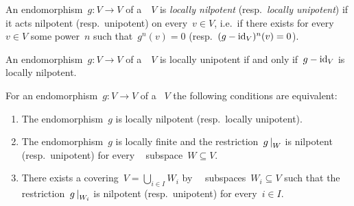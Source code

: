 \begin{definition}
  An endomorphism~$g \colon V \to V$ of a~~$V$ is \emph{locally nilpotent} (resp.\ \emph{locally unipotent}) if it acts nilpotent (resp.\ unipotent) on every~$v \in V$, i.e.\ if there exists for every~$v \in V$ some power~$n$ such that~$g^n(v) = 0$ (resp.~$(g - \operatorname{id}_V)^n(v) = 0$).
\end{definition}


\begin{remark}
  An endomorphism~$g \colon V \to V$ of a~~$V$ is locally unipotent if and only if~$g - \operatorname{id}_V$ is locally nilpotent.
\end{remark}


\begin{lemma}
  \label{characterization of locally potent}
  For an endomorphism~$g \colon V \to V$ of a ~$V$ the following conditions are equivalent:
  \begin{enumerate}
    \item
      \label{locally potent}
      The endomorphism~$g$ is locally nilpotent (resp.\ locally unipotent).
    \item
      \label{locally finite and all fd subspaces}
      The endomorphism~$g$ is locally finite and the restriction~$\restrict{g}{W}$ is nilpotent (resp.\ unipotent) for every ~ subspace~$W \subseteq V$.
    \item
      \label{a covering by fd subspaces}
      There exists a covering~$V = \bigcup_{i \in I} W_i$ by~~ subspaces~$W_i \subseteq V$ such that the restriction~$\restrict{g}{W_i}$ is nilpotent (resp.\ unipotent) for every~$i \in I$.
  \end{enumerate}
\end{lemma}


